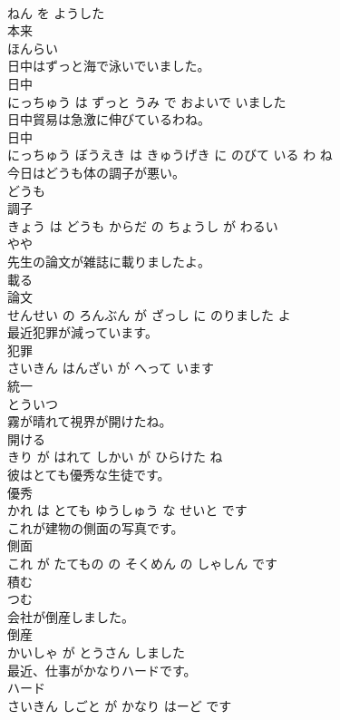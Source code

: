 \documentclass[8pt]{extreport}
\begin{document}
\begin{CJK}{UTF8}{min}
\\	ねん を ようした			
\\	本来	
\\	ほんらい			
\\	日中はずっと海で泳いでいました。	
\\	日中 
\\	にっちゅう は ずっと うみ で およいで いました			
\\	日中貿易は急激に伸びているわね。	
\\	日中 
\\	にっちゅう ぼうえき は きゅうげき に のびて いる わ ね			
\\	今日はどうも体の調子が悪い。	
\\	どうも 
\\	調子 
\\	きょう は どうも からだ の ちょうし が わるい			
\\	やや	
\\	先生の論文が雑誌に載りましたよ。	
\\	載る 
\\	論文 
\\	せんせい の ろんぶん が ざっし に のりました よ			
\\	最近犯罪が減っています。	
\\	犯罪 
\\	さいきん はんざい が へって います			
\\	統一	
\\	とういつ			
\\	霧が晴れて視界が開けたね。	
\\	開ける 
\\	きり が はれて しかい が ひらけた ね			
\\	彼はとても優秀な生徒です。	
\\	優秀 
\\	かれ は とても ゆうしゅう な せいと です			
\\	これが建物の側面の写真です。	
\\	側面 
\\	これ が たてもの の そくめん の しゃしん です			
\\	積む	
\\	つむ			
\\	会社が倒産しました。	
\\	倒産 
\\	かいしゃ が とうさん しました			
\\	最近、仕事がかなりハードです。	
\\	ハード 
\\	さいきん しごと が かなり はーど です			

\end{CJK}
\end{document}
